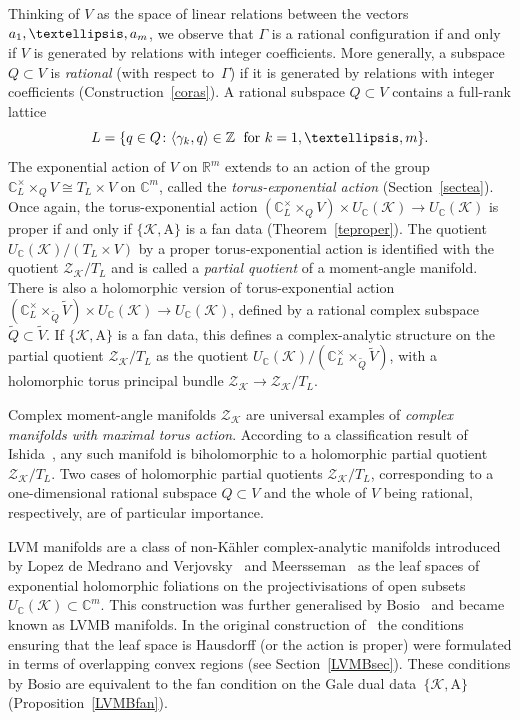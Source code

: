 \documentclass[a4paper]{amsart}
\theoremstyle{definition}
\theoremstyle{remark}
\numberwithin{equation}{section}
\def\R{\mathbb R}
\def\C{\mathbb C}
\def\R{\mathbb R}
\def\Z{\mathbb Z}
\def\sK{\mathcal K}
\newcommand{\mb}[1]{{\textbf {\textit#1}}}
\newcommand{\zk}{\mathcal Z_{\mathcal K}}
\newcommand{\<}{\langle}
\renewcommand{\>}{\rangle}
\begin{document}
Thinking of $V$ as the space of linear relations between the vectors $\mb a_1,\ldots,\mb a_m$, we observe that $\Gamma$ is a rational configuration if and only if $V$ is generated by relations with integer coefficients. More generally, a
subspace $Q\subset V$ is \emph{rational} (with respect to~$\Gamma$) if it is generated by relations with integer coefficients (Construction~\ref{coras}). A rational subspace $Q\subset V$ contains a full-rank lattice
\[
  L=\{\mb q\in Q\colon\langle\gamma_k,\mb q\rangle\in\Z\;
  \text{ for }k=1,\ldots,m\}.
\]
The exponential action of $V$ on $\R^m$ extends to an action of the group $\C^\times_L\times_Q V\cong T_L\times V$ on $\C^m$, called the \emph{torus-exponential action} (Section~\ref{sectea}). Once again, the torus-exponential action $(\C^\times_L\times_Q V)\times U_\C(\sK)\to U_\C(\sK)$ is proper if and only if $\{\sK,\mathrm A\}$ is a fan data (Theorem~\ref{teproper}).
The quotient $U_\C(\sK)/(T_L\times V)$ by a proper torus-exponential action is identified with the quotient $\zk/T_L$ and is called a \emph{partial quotient} of a moment-angle manifold. There is also a holomorphic version of torus-exponential action $(\C^\times_L\times_{\widetilde Q}{\widetilde V})\times U_\C(\sK)\to U_\C(\sK)$, defined by a rational complex subspace $\widetilde Q\subset\widetilde V$. If $\{\sK,\mathrm A\}$ is a fan data, this defines a complex-analytic structure on the partial quotient $\zk/T_L$ as the quotient $U_\C(\sK)/(\C^\times_L\times_{\widetilde Q}{\widetilde V})$, with a holomorphic torus principal bundle $\zk\to\zk/T_L$.

Complex moment-angle manifolds $\zk$ are universal examples of \emph{complex manifolds with maximal torus action}. According to a classification result of Ishida~\cite{ishi19}, any such manifold is biholomorphic to a holomorphic partial quotient $\zk/T_L$. Two cases of holomorphic partial quotients $\zk/T_L$, corresponding to a one-dimensional rational subspace $Q\subset V$ and the whole of $V$ being rational, respectively, are of particular importance.

LVM manifolds are a class of non-K\"ahler complex-analytic manifolds introduced by Lopez de Medrano and Verjovsky~\cite{lo-ve97} and Meersseman~\cite{meer00} as the leaf spaces of exponential holomorphic foliations on the projectivisations of open subsets $U_\C(\sK)\subset\C^m$. This construction was further generalised by Bosio~\cite{bosi01} and became known as LVMB manifolds. In the original construction of~\cite{bosi01} the conditions ensuring that the leaf space is Hausdorff (or the action is proper) were formulated in terms of overlapping convex regions (see Section~\ref{LVMBsec}). These conditions by Bosio are equivalent to the fan condition on the Gale dual data~$\{\mathcal K,\mathrm A\}$ (Proposition~\ref{LVMBfan}). 
\end{document}
